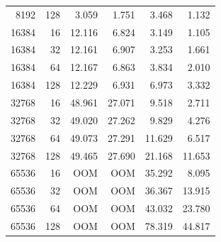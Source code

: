 \documentclass[11pt]{article}
\begin{document}
\begin{table}[H]
\begin{tabular}{rrrrrr}
8192 & 128 & 3.059 & 1.751 & 3.468 & 1.132 \\
16384 & 16 & 12.116 & 6.824 & 3.149 & 1.105 \\
16384 & 32 & 12.161 & 6.907 & 3.253 & 1.661 \\
16384 & 64 & 12.167 & 6.863 & 3.834 & 2.010 \\
16384 & 128 & 12.229 & 6.931 & 6.973 & 3.332 \\
32768 & 16 & 48.961 & 27.071 & 9.518 & 2.711 \\
32768 & 32 & 49.020 & 27.262 & 9.829 & 4.276 \\
32768 & 64 & 49.073 & 27.291 & 11.629 & 6.517 \\
32768 & 128 & 49.465 & 27.690 & 21.168 & 11.653 \\
65536 & 16 & OOM & OOM & 35.292 & 8.095 \\
65536 & 32 & OOM & OOM & 36.367 & 13.915 \\
65536 & 64 & OOM & OOM & 43.032 & 23.780 \\
65536 & 128 & OOM & OOM & 78.319 & 44.817 \\
\bottomrule
\end{tabular}
\end{table}
\end{document}
